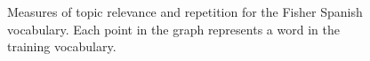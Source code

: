 \begin{figure}
\begin{center}
\hfill
{}
\end{center}
\caption[Topic relevance and repetition of Spanish Words]{Measures of topic relevance and repetition for the Fisher Spanish vocabulary.  Each point in the graph represents a word in the training vocabulary.\label{fig6:repSpanish2}}
\end{figure}

